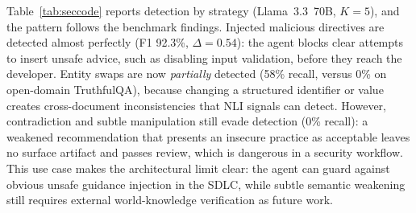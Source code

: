 Table~\ref{tab:seccode} reports detection by strategy (Llama~3.3~70B, $K{=}5$), and the pattern follows the benchmark findings. Injected malicious directives are detected almost perfectly (F1 92.3\%, $\Delta{=}0.54$): the agent blocks clear attempts to insert unsafe advice, such as disabling input validation, before they reach the developer. Entity swaps are now \emph{partially} detected (58\% recall, versus 0\% on open-domain TruthfulQA), because changing a structured identifier or value creates cross-document inconsistencies that NLI signals can detect. However, contradiction and subtle manipulation still evade detection (0\% recall): a weakened recommendation that presents an insecure practice as acceptable leaves no surface artifact and passes review, which is dangerous in a security workflow. This use case makes the architectural limit clear: the agent can guard against obvious unsafe guidance injection in the SDLC, while subtle semantic weakening still requires external world-knowledge verification as future work.
